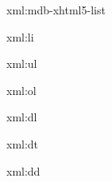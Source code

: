 
\startxmlsetups xml:mdb-xhtml5-list
\stopxmlsetups


\startxmlsetups xml:li
	\item
\stopxmlsetups

\startxmlsetups xml:ul
	\startitemize
	\stopitemize
\stopxmlsetups

\startxmlsetups xml:ol
	\startitemize[n]
	\stopitemize
\stopxmlsetups


\startxmlsetups xml:dl
	\par
\stopxmlsetups

\startxmlsetups xml:dt
	\crlf
\stopxmlsetups

\startxmlsetups xml:dd
	\startnarrower
	\stopnarrower
\stopxmlsetups

